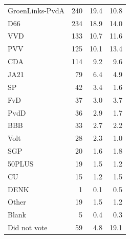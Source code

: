 \begin{table}[htbp]
\begin{tabular}{@{}lrrr@{}}
\quad GroenLinks-PvdA & 240 & 19.4 & 10.8 \\
\quad D66 & 234 & 18.9 & 14.0 \\
\quad VVD & 133 & 10.7 & 11.6 \\
\quad PVV & 125 & 10.1 & 13.4 \\
\quad CDA & 114 & 9.2 & 9.6 \\
\quad JA21 & 79 & 6.4 & 4.9 \\
\quad SP & 42 & 3.4 & 1.6 \\
\quad FvD & 37 & 3.0 & 3.7 \\
\quad PvdD & 36 & 2.9 & 1.7 \\
\quad BBB & 33 & 2.7 & 2.2 \\
\quad Volt & 28 & 2.3 & 1.0 \\
\quad SGP & 20 & 1.6 & 1.8 \\
\quad 50PLUS & 19 & 1.5 & 1.2 \\
\quad CU & 15 & 1.2 & 1.5 \\
\quad DENK & 1 & 0.1 & 0.5 \\
\quad Other & 19 & 1.5 & 1.2 \\
\quad Blank & 5 & 0.4 & 0.3 \\
\quad Did not vote & 59 & 4.8 & 19.1 \\
\bottomrule
\end{tabular}
\end{table}
